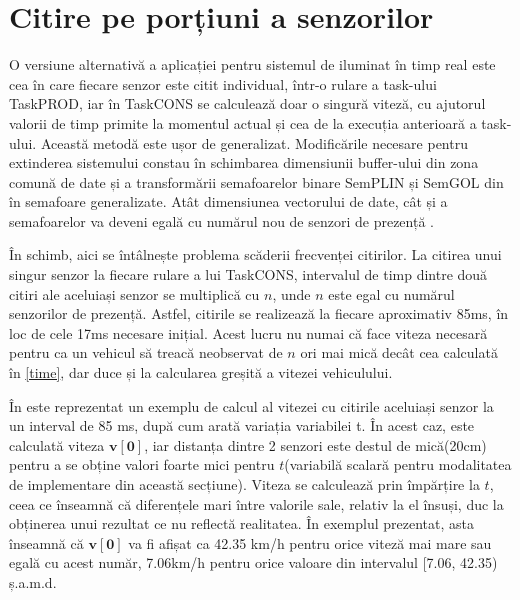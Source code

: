 \section{Citire pe porțiuni a senzorilor} \label{part}

O versiune alternativă a aplicației pentru sistemul de iluminat în timp real este cea în care fiecare senzor este citit individual, într-o rulare a task-ului TaskPROD, iar în TaskCONS se calculează doar o singură viteză, cu ajutorul valorii de timp primite la momentul actual și cea de la execuția anterioară a task-ului. Această metodă este ușor de generalizat. Modificările necesare pentru extinderea sistemului constau în schimbarea dimensiunii buffer-ului din zona comună de date și a transformării semafoarelor binare SemPLIN și SemGOL din  în semafoare generalizate. Atât dimensiunea vectorului de date, cât și a semafoarelor va deveni egală cu numărul nou de senzori de prezență \cite{patr}.

În schimb, aici se întâlnește problema scăderii frecvenței citirilor. La citirea unui singur senzor la fiecare rulare a lui TaskCONS, intervalul de timp dintre două citiri ale aceluiași senzor se multiplică cu $n$, unde $n$ este egal cu numărul senzorilor de prezență. Astfel, citirile se realizează la fiecare aproximativ 85ms, în loc de cele 17ms necesare inițial. Acest lucru nu numai că face viteza necesară pentru ca un vehicul să treacă neobservat de $n$ ori mai mică decât cea calculată în \autoref{time}, dar duce și la calcularea greșită a vitezei vehiculului.

În  este reprezentat un exemplu de calcul al vitezei cu citirile aceluiași senzor la un interval de 85 ms, după cum arată variația variabilei t. În acest caz, este calculată viteza $\mathbf{v[0]}$, iar distanța dintre 2 senzori este destul de mică(20cm) pentru a se obține valori foarte mici pentru $t$(variabilă scalară pentru modalitatea de implementare din această secțiune). Viteza se calculează prin împărțire la $t$, ceea ce înseamnă că diferențele mari între valorile sale, relativ la el însuși, duc la obținerea unui rezultat ce nu reflectă realitatea. În exemplul prezentat, asta înseamnă că $\mathbf{v[0]}$ va fi afișat ca 42.35 km/h pentru orice viteză mai mare sau egală cu acest număr, 7.06km/h pentru orice valoare din intervalul [7.06, 42.35) ș.a.m.d.

